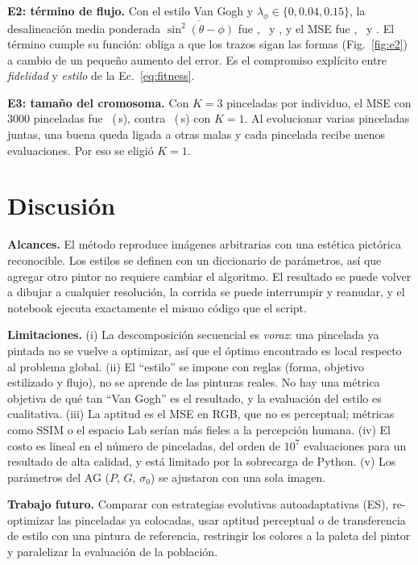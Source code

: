 \documentclass[10pt,letterpaper]{article}
\begin{document}
\textbf{E2: término de flujo.} Con el estilo Van Gogh y $\lambda_\phi\in\{0, 0.04, 0.15\}$, la desalineación media ponderada $\overline{\sin^2(\theta-\phi)}$ fue \lamCeroDes, \lamMedDes\ y \lamAltoDes, y el MSE fue \lamCeroMSE, \lamMedMSE\ y \lamAltoMSE. El término cumple su función: obliga a que los trazos sigan las formas (Fig.~\ref{fig:e2}) a cambio de un pequeño aumento del error. Es el compromiso explícito entre \emph{fidelidad} y \emph{estilo} de la Ec.~\ref{eq:fitness}.

\textbf{E3: tamaño del cromosoma.} Con $K=3$ pinceladas por individuo, el MSE con 3000 pinceladas fue \kTresMSE\ (\kTresT\,s), contra \kUnoMSE\ (\kUnoT\,s) con $K=1$. Al evolucionar varias pinceladas juntas, una buena queda ligada a otras malas y cada pincelada recibe menos evaluaciones. Por eso se eligió $K=1$.

\section{Discusión}
\textbf{Alcances.} El método reproduce imágenes arbitrarias con una estética pictórica reconocible. Los estilos se definen con un diccionario de parámetros, así que agregar otro pintor no requiere cambiar el algoritmo. El resultado se puede volver a dibujar a cualquier resolución, la corrida se puede interrumpir y reanudar, y el notebook ejecuta exactamente el mismo código que el script.

\textbf{Limitaciones.} (i) La descomposición secuencial es \emph{voraz}: una pincelada ya pintada no se vuelve a optimizar, así que el óptimo encontrado es local respecto al problema global. (ii) El ``estilo'' se impone con reglas (forma, objetivo estilizado y flujo), no se aprende de las pinturas reales. No hay una métrica objetiva de qué tan ``Van Gogh'' es el resultado, y la evaluación del estilo es cualitativa. (iii) La aptitud es el MSE en RGB, que no es perceptual; métricas como SSIM o el espacio Lab serían más fieles a la percepción humana. (iv) El costo es lineal en el número de pinceladas, del orden de $10^7$ evaluaciones para un resultado de alta calidad, y está limitado por la sobrecarga de Python. (v) Los parámetros del AG ($P$, $G$, $\sigma_0$) se ajustaron con una sola imagen.

\textbf{Trabajo futuro.} Comparar con estrategias evolutivas autoadaptativas (ES), re-optimizar las pinceladas ya colocadas, usar aptitud perceptual o de transferencia de estilo con una pintura de referencia, restringir los colores a la paleta del pintor y paralelizar la evaluación de la población.
\end{document}
